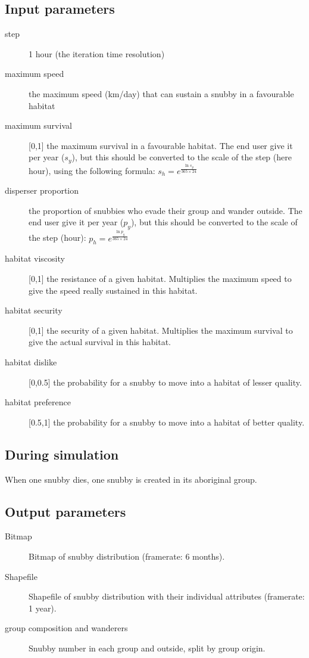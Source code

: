 \subsection{Input parameters}
\begin{description}
	\item[step] 1 hour (the iteration time resolution)
	\item[maximum speed] the maximum speed (km/day) that can sustain a snubby in a favourable habitat
	\item[maximum survival]  [0,1] the maximum survival in a favourable habitat. The end user give it per year ($s_y$), but this should be converted to the scale of the step (here hour), using the following formula:
	$s_h=e^{\frac{\ln{s_y}}{365\times24}}$
	\item[disperser proportion] the proportion of snubbies who evade their group and wander outside. The end user give it per year  ($p_y$), but this should be converted to the scale of the step (hour): $p_h=e^{\frac{\ln{p_y}}{365\times24}}$
	\item[habitat viscosity] [0,1] the resistance of a given habitat.  Multiplies the maximum speed to give the speed really sustained in this habitat.
	\item[habitat security] [0,1] the security of a given habitat.  Multiplies the maximum survival to give the actual survival in this habitat.
	\item[habitat dislike] [0,0.5] the probability for a snubby to move into a habitat of lesser quality.
	\item[habitat preference] [0.5,1] the probability for a snubby to move into a habitat of better quality.
	
\end{description}

\subsection{During simulation}
When one snubby dies, one snubby is created in its aboriginal group.


\subsection{Output parameters}

\begin{description}
	\item[Bitmap] Bitmap of snubby distribution (framerate: 6 months).
	\item[Shapefile] Shapefile of snubby distribution with their individual attributes (framerate: 1 year).
	\item[group composition and wanderers] Snubby number in each group and outside, split by group origin.
	
\end{description}





